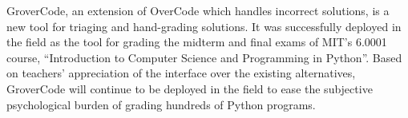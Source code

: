 GroverCode, an extension of OverCode which handles incorrect solutions, is a new tool for triaging and hand-grading solutions. It was successfully deployed in the field as the tool for grading the midterm and final exams of MIT's 6.0001 course, ``Introduction to Computer Science and Programming in Python''. Based on teachers' appreciation of the interface over the existing alternatives, GroverCode will continue to be deployed in the field to ease the subjective psychological burden of grading hundreds of Python programs. %
